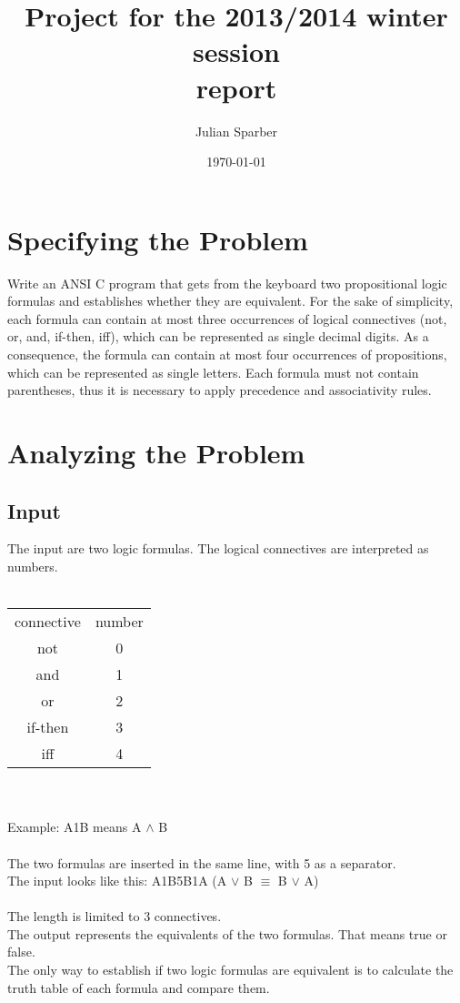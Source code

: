 \documentclass[11pt, a4paper, titlepage, block]{article}
\title{\textbf{Project for the 2013/2014 winter session\\ report}}
\author{Julian Sparber}
\date{\today}
\begin{document}
\maketitle
\section{Specifying the Problem}
	Write an ANSI C program that gets from the keyboard two propositional logic formulas and
	establishes whether they are equivalent. For the sake of simplicity, each formula can contain at
	most three occurrences of logical connectives (not, or, and, if-then, iff), which can be represented
	as single decimal digits. As a consequence, the formula can contain at most four occurrences of
	propositions, which can be represented as single letters. Each formula must not contain parentheses,
	thus it is necessary to apply precedence and associativity rules.
	\newpage
\section{Analyzing the Problem}
	\subsection{Input}
	The input are two logic formulas. The logical connectives are interpreted as numbers. \\
	\\
	\begin{tabular}{cc}
	connective & number\\
		not & 0\\
		and & 1\\
		or & 2\\
		if-then & 3\\
		iff & 4\\
	\end{tabular}\\
	\\
	Example: A1B means A $\wedge $ B\\
	\\ 
	The two formulas are inserted in the same line, with 5 as a separator.\\
	The input looks like this: A1B5B1A (A $\vee $ B $\equiv $ B $\vee $ A)\\\\
	The length is limited to 3 connectives.\\
	The output represents the equivalents of the two formulas. That means true or false.\\
	The only way to establish if two logic formulas are equivalent is to calculate the truth table of each formula and compare them.
	
\end{document}
